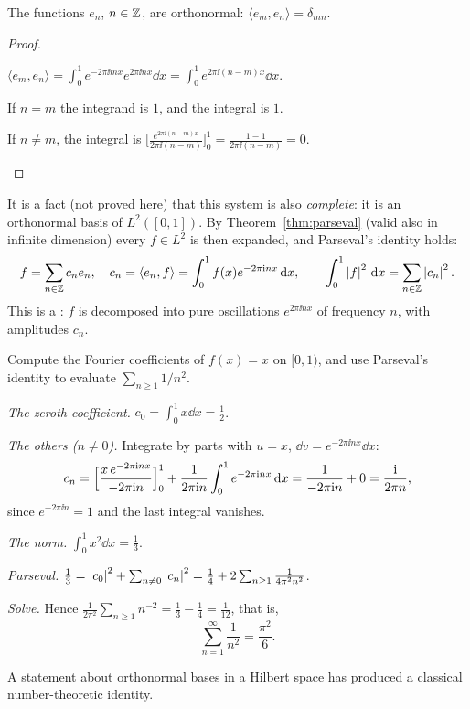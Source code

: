 \begin{proposition}\label{prop:expo-orthonormal}
  The functions $e_n$, $n\in\mathbb{Z}$, are orthonormal: $\langle e_m,e_n\rangle=\delta_{mn}$.
\end{proposition}
\begin{proof}
  \begin{steps}
    \item $\langle e_m,e_n\rangle=\int_0^1e^{-2\pi\ii mx}e^{2\pi\ii nx}\dd x=\int_0^1e^{2\pi\ii(n-m)x}\dd x$.
    \item If $n=m$ the integrand is $1$, and the integral is $1$.
    \item If $n\neq m$, the integral is $\bigl[\frac{e^{2\pi\ii(n-m)x}}{2\pi\ii(n-m)}\bigr]_0^1=\frac{1-1}{2\pi\ii(n-m)}=0$. \qedhere
  \end{steps}
\end{proof}

It is a fact (not proved here) that this system is also \emph{complete}: it is an orthonormal basis of $L^2([0,1])$. By Theorem~\ref{thm:parseval} (valid also in infinite dimension) every $f\in L^2$ is then expanded, and Parseval's identity holds:
\[
  f=\sum_{n\in\mathbb{Z}}c_ne_n,\quad c_n=\langle e_n,f\rangle=\int_0^1f(x)e^{-2\pi\mathrm{i} nx}\,\mathrm{d} x,\qquad \int_0^1\left|f\right|^2\,\mathrm{d} x=\sum_{n\in\mathbb{Z}}\left|c_n\right|^2 .
\]
This is a : $f$ is decomposed into pure oscillations $e^{2\pi\ii nx}$ of frequency $n$, with amplitudes $c_n$.

\begin{example}\label{ex:fourier-ramp}
  Compute the Fourier coefficients of $f(x)=x$ on $[0,1)$, and use Parseval's identity to evaluate $\sum_{n\ge1}1/n^2$.
\end{example}
\begin{solution}
  \begin{steps}
    \item \emph{The zeroth coefficient.} $c_0=\int_0^1x\dd x=\tfrac12$.
    \item \emph{The others ($n\neq0$).} Integrate by parts with $u=x$, $\dd v=e^{-2\pi\ii nx}\dd x$:
      \[
        c_n=\Bigl[\frac{x\,e^{-2\pi\mathrm{i} nx}}{-2\pi\mathrm{i} n}\Bigr]_0^1+\frac1{2\pi\mathrm{i} n}\int_0^1e^{-2\pi\mathrm{i} nx}\,\mathrm{d} x
        =\frac{1}{-2\pi\mathrm{i} n}+0=\frac{\mathrm{i}}{2\pi n},
      \]
      since $e^{-2\pi\ii n}=1$ and the last integral vanishes.
    \item \emph{The norm.} $\int_0^1x^2\dd x=\tfrac13$.
    \item \emph{Parseval.} $\tfrac13=\left|c_0\right|^2+\sum_{n\neq0}\left|c_n\right|^2=\tfrac14+2\sum_{n\ge1}\frac1{4\pi^2n^2}$.
    \item \emph{Solve.} Hence $\tfrac{1}{2\pi^2}\sum_{n\ge1}n^{-2}=\tfrac13-\tfrac14=\tfrac1{12}$, that is,
      \[
        \sum_{n=1}^\infty\frac1{n^2}=\frac{\pi^2}{6}.
      \]
  \end{steps}
  A statement about orthonormal bases in a Hilbert space has produced a classical number-theoretic identity.
\end{solution}

